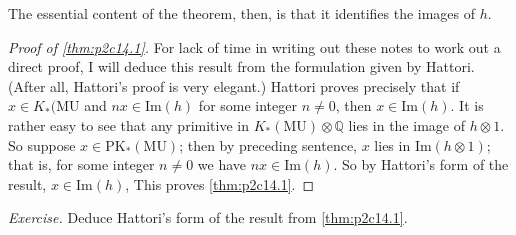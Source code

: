 \documentclass[../main]{subfiles}
\begin{document}
The essential content of the theorem, then, is that it identifies the images of $h$. 
\begin{proof}[Proof of \ref{thm:p2c14.1}]
For lack of time in writing out these notes to work out a direct proof, I will deduce this result from the formulation given by Hattori. (After all, Hattori's proof is very elegant.) Hattori
proves precisely that if $x\in K_\ast(\mathrm{MU}$ and $nx\in \mathrm{Im}(h)$ for some integer
$n\neq 0$, then $x \in\mathrm{Im}(h)$. It is rather easy to see that any primitive in $K_\ast(\mathrm{MU}) \otimes \mathbb{Q}$ lies in the image of $h\otimes 1$. So suppose $x \in \mathrm{PK}_\ast(\mathrm{MU})$; then
by preceding sentence, $x$ lies in $\mathrm{Im}(h\otimes 1)$; that is, for some integer $n\neq 0$ we have $nx \in\mathrm{Im}(h)$. So by Hattori's form of the result, $x \in\mathrm{Im}(h)$,
This proves \eqref{thm:p2c14.1}. 
\end{proof}
\emph{Exercise.} Deduce Hattori's form of the result from \eqref{thm:p2c14.1}.
\end{document}
